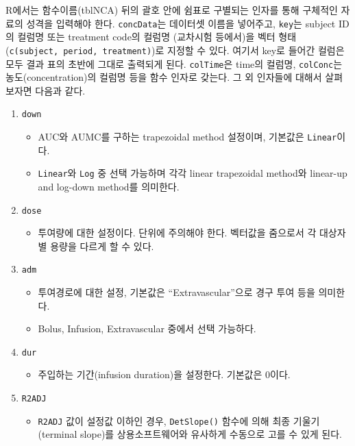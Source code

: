 \documentclass[
  11pt,
  krantz2, a4paper, twoside]{krantz}
\providecommand{\tightlist}{%
  \setlength{\itemsep}{0pt}\setlength{\parskip}{0pt}}
\theoremstyle{definition}
\theoremstyle{definition}
\theoremstyle{definition}
\theoremstyle{definition}
\theoremstyle{remark}
\begin{document}
R에서는 함수이름(tblNCA) 뒤의 괄호 안에 쉼표로 구별되는 인자를 통해 구체적인 자료의 성격을 입력해야 한다.
\texttt{concData}는 데이터셋 이름을 넣어주고, \texttt{key}는 subject ID의 컬럼명 또는 treatment code의 컬럼명 (교차시험 등에서)을 벡터 형태(\texttt{c(\textquotesingle{}subject\textquotesingle{},\ \textquotesingle{}period\textquotesingle{},\ \textquotesingle{}treatment\textquotesingle{})})로 지정할 수 있다. 여기서 key로 들어간 컬럼은 모두 결과 표의 초반에 그대로 출력되게 된다.
\texttt{colTime}은 time의 컬럼명, \texttt{colConc}는 농도(concentration)의 컬럼명 등을 함수 인자로 갖는다. 그 외 인자들에 대해서 살펴보자면 다음과 같다.

\begin{enumerate}
\def\labelenumi{\arabic{enumi}.}
\tightlist
\item
  \texttt{down}

  \begin{itemize}
  \tightlist
  \item
    AUC와 AUMC를 구하는 trapezoidal method 설정이며, 기본값은 \texttt{Linear}이다.
  \item
    \texttt{Linear}와 \texttt{Log} 중 선택 가능하며 각각 linear trapezoidal method와 linear-up and log-down method를 의미한다.
  \end{itemize}
\item
  \texttt{dose}

  \begin{itemize}
  \tightlist
  \item
    투여량에 대한 설정이다. 단위에 주의해야 한다. 벡터값을 줌으로서 각 대상자별 용량을 다르게 할 수 있다.
  \end{itemize}
\item
  \texttt{adm}

  \begin{itemize}
  \tightlist
  \item
    투여경로에 대한 설정, 기본값은 ``Extravascular''으로 경구 투여 등을 의미한다.
  \item
    Bolus, Infusion, Extravascular 중에서 선택 가능하다.
  \end{itemize}
\item
  \texttt{dur}

  \begin{itemize}
  \tightlist
  \item
    주입하는 기간(infusion duration)을 설정한다. 기본값은 0이다.
  \end{itemize}
\item
  \texttt{R2ADJ}

  \begin{itemize}
  \tightlist
  \item
    \texttt{R2ADJ} 값이 설정값 이하인 경우, \texttt{DetSlope()} 함수에 의해 최종 기울기(terminal slope)를 상용소프트웨어와 유사하게 수동으로 고를 수 있게 된다.
  \end{itemize}
\end{enumerate}
\end{document}

